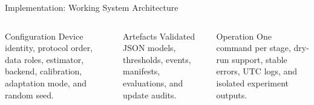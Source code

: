 \documentclass[aspectratio=169,10pt]{beamer}
\begin{document}
\begin{frame}{Implementation: Working System Architecture}
\centering
{}

\vspace{0.55cm}
\begin{columns}[T,onlytextwidth]
\begin{block}{Configuration}
Device identity, protocol order, data roles, estimator, backend, calibration,
adaptation mode, and random seed.
\end{block}

\begin{block}{Artefacts}
Validated JSON models, thresholds, events, manifests, evaluations, and update
audits.
\end{block}

\begin{block}{Operation}
One command per stage, dry-run support, stable errors, UTC logs, and isolated
experiment outputs.
\end{block}
\end{columns}
\end{frame}
\end{document}
